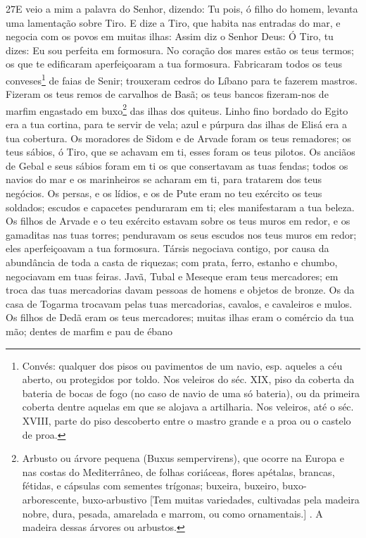 \lettrine{27} E veio a mim a palavra do Senhor, dizendo:
Tu pois, ó filho do homem, levanta uma lamentação sobre Tiro.
E dize a Tiro, que habita nas entradas do mar, e negocia com os
povos em muitas ilhas: Assim diz o Senhor Deus: Ó Tiro, tu dizes: Eu
sou perfeita em formosura. No coração dos mares estão os teus
termos; os que te edificaram aperfeiçoaram a tua formosura.
Fabricaram todos os teus conveses\footnote{Convés: qualquer dos
pisos ou pavimentos de um navio, esp. aqueles a céu aberto, ou
protegidos por toldo. Nos veleiros do séc. XIX, piso da coberta da
bateria de bocas de fogo (no caso de navio de uma só bateria), ou da
primeira coberta dentre aquelas em que se alojava a artilharia. Nos
veleiros, até o séc. XVIII, parte do piso descoberto entre o mastro
grande e a proa ou o castelo de proa.} de faias de Senir; trouxeram
cedros do Líbano para te fazerem mastros. Fizeram os teus remos
de carvalhos de Basã; os teus bancos fizeram-nos de marfim engastado
em buxo\footnote{Arbusto ou árvore pequena (Buxus sempervirens), que
ocorre na Europa e nas costas do Mediterrâneo, de folhas coriáceas,
flores apétalas, brancas, fétidas, e cápsulas com sementes trígonas;
buxeira, buxeiro, buxo-arborescente, buxo-arbustivo [Tem muitas
variedades, cultivadas pela madeira nobre, dura, pesada, amarelada e
marrom, ou como ornamentais.] . A madeira dessas árvores ou
arbustos.} das ilhas dos quiteus. Linho fino bordado do Egito
era a tua cortina, para te servir de vela; azul e púrpura das ilhas
de Elisá era a tua cobertura. Os moradores de Sidom e de Arvade
foram os teus remadores; os teus sábios, ó Tiro, que se achavam em
ti, esses foram os teus pilotos. Os anciãos de Gebal e seus
sábios foram em ti os que consertavam as tuas fendas; todos os
navios do mar e os marinheiros se acharam em ti, para tratarem dos
teus negócios. Os persas, e os lídios, e os de Pute eram no
teu exército os teus soldados; escudos e capacetes penduraram em ti;
eles manifestaram a tua beleza. Os filhos de Arvade e o teu
exército estavam sobre os teus muros em redor, e os gamaditas nas
tuas torres; penduravam os seus escudos nos teus muros em redor;
eles aperfeiçoavam a tua formosura. Társis negociava contigo,
por causa da abundância de toda a casta de riquezas; com prata,
ferro, estanho e chumbo, negociavam em tuas feiras. Javã,
Tubal e Meseque eram teus mercadores; em troca das tuas mercadorias
davam pessoas de homens e objetos de bronze. Os da casa de
Togarma trocavam pelas tuas mercadorias, cavalos, e cavaleiros e
mulos. Os filhos de Dedã eram os teus mercadores; muitas
ilhas eram o comércio da tua mão; dentes de marfim e pau de ébano
